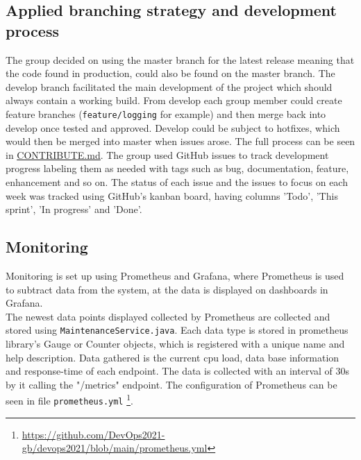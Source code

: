 
\subsection{Applied branching strategy and development process} %
The group decided on using the master branch for the latest release meaning that the code found in production, could also be found on the master branch. The develop branch facilitated the main development of the project which should always contain a working build. From develop each group member could create feature branches (\texttt{feature/logging} for example) and then merge back into develop once tested and approved. Develop could be subject to hotfixes, which would then be merged into master when issues arose. The full process can be seen in \underline{\href{https://github.com/DevOps2021-gb/devops2021/blob/main/CONTRIBUTE.md}{CONTRIBUTE.md}}. The group used GitHub issues to track development progress labeling them as needed with tags such as bug, documentation, feature, enhancement and so on. The status of each issue and the issues to focus on each week was tracked using GitHub's kanban board, having columns 'Todo', 'This sprint', 'In progress' and 'Done'.

\subsection{Monitoring} %
Monitoring is set up using Prometheus and Grafana, where Prometheus is used to subtract data from the system, at the data is displayed on dashboards in Grafana.\\
The newest data points displayed collected by Prometheus are collected and stored using \texttt{MaintenanceService.java}. Each data type is stored in prometheus library's Gauge or Counter objects, which is registered with a unique name and help description. Data gathered is the current cpu load, data base information and response-time of each endpoint. The data is collected with an interval of 30s by it calling the "/metrics" endpoint. The configuration of Prometheus can be seen in file \texttt{prometheus.yml} \footnote{\url{https://github.com/DevOps2021-gb/devops2021/blob/main/prometheus.yml}}.


